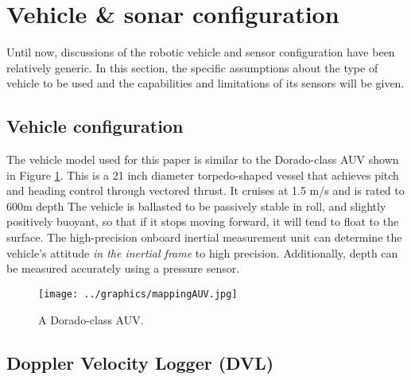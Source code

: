 \section{Vehicle \& sonar configuration}
\label{sec.VehicleSetup}

Until now, discussions of the robotic vehicle and sensor configuration have been relatively generic. In this section, the specific assumptions about the type of vehicle to be used and the capabilities and limitations of its sensors will be given.

\subsection{Vehicle configuration}
The vehicle model used for this paper is similar to the Dorado-class AUV shown in Figure \ref{fig:AUVdorado}. This is a 21 inch diameter torpedo-shaped vessel that achieves pitch and heading control through vectored thrust. It cruises at 1.5 m/s and is rated to 600m depth The vehicle is ballasted to be passively stable in roll, and slightly positively buoyant, so that if it stops moving forward, it will tend to float to the surface. The high-precision onboard inertial measurement unit can determine the vehicle's attitude \emph{in the inertial frame} to high precision. Additionally, depth can be measured accurately using a pressure sensor. 

\begin{figure}[htb]
   \centering
   \texttt{[image: ../graphics/mappingAUV.jpg]} %
   \caption{A Dorado-class AUV.}
   \label{fig:AUVdorado}
\end{figure}



\subsection{Doppler Velocity Logger (DVL)}

